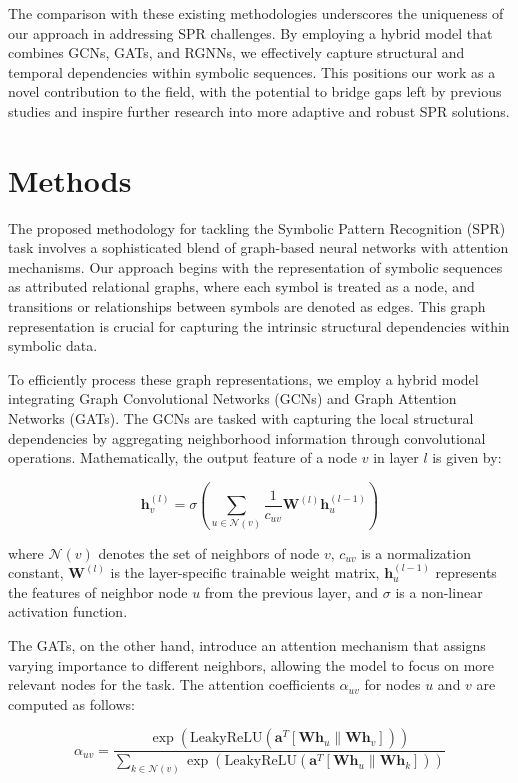 \documentclass{article}
\begin{document}
The comparison with these existing methodologies underscores the uniqueness of our approach in addressing SPR challenges. By employing a hybrid model that combines GCNs, GATs, and RGNNs, we effectively capture structural and temporal dependencies within symbolic sequences. This positions our work as a novel contribution to the field, with the potential to bridge gaps left by previous studies and inspire further research into more adaptive and robust SPR solutions.

\section{Methods}
The proposed methodology for tackling the Symbolic Pattern Recognition (SPR) task involves a sophisticated blend of graph-based neural networks with attention mechanisms. Our approach begins with the representation of symbolic sequences as attributed relational graphs, where each symbol is treated as a node, and transitions or relationships between symbols are denoted as edges. This graph representation is crucial for capturing the intrinsic structural dependencies within symbolic data.

To efficiently process these graph representations, we employ a hybrid model integrating Graph Convolutional Networks (GCNs) and Graph Attention Networks (GATs). The GCNs are tasked with capturing the local structural dependencies by aggregating neighborhood information through convolutional operations. Mathematically, the output feature of a node \(v\) in layer \(l\) is given by:

\[
\mathbf{h}_v^{(l)} = \sigma \left( \sum_{u \in \mathcal{N}(v)} \frac{1}{c_{uv}} \mathbf{W}^{(l)} \mathbf{h}_u^{(l-1)} \right)
\]

where \(\mathcal{N}(v)\) denotes the set of neighbors of node \(v\), \(c_{uv}\) is a normalization constant, \(\mathbf{W}^{(l)}\) is the layer-specific trainable weight matrix, \(\mathbf{h}_u^{(l-1)}\) represents the features of neighbor node \(u\) from the previous layer, and \(\sigma\) is a non-linear activation function.

The GATs, on the other hand, introduce an attention mechanism that assigns varying importance to different neighbors, allowing the model to focus on more relevant nodes for the task. The attention coefficients \(\alpha_{uv}\) for nodes \(u\) and \(v\) are computed as follows:

\[
\alpha_{uv} = \frac{\exp \left( \text{LeakyReLU} \left( \mathbf{a}^T [\mathbf{W} \mathbf{h}_u \parallel \mathbf{W} \mathbf{h}_v] \right) \right)}{\sum_{k \in \mathcal{N}(v)} \exp \left( \text{LeakyReLU} \left( \mathbf{a}^T [\mathbf{W} \mathbf{h}_u \parallel \mathbf{W} \mathbf{h}_k] \right) \right)}
\]
\end{document}
